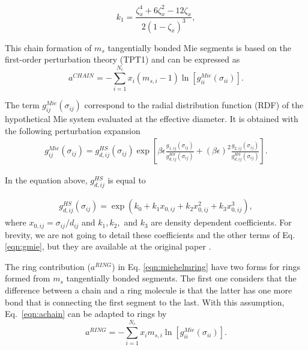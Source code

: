 \begin{equation}
k_{1} = \frac{{\zeta}_{x}^{4} +6{\zeta}_{x}^{2}- 12{\zeta}_{x}}{2(1-\zeta_{x})^{3}},
\end{equation}

 This chain formation of $m_{s}$ tangentially bonded Mie segments is based on the first-order perturbation theory (TPT1)  \cite{papa2014} and can be expressed as
	\begin{equation}
	a^{CHAIN} =-\sum_{i=1}^{N_{c}} x_{i}(m_{s,i} - 1)\ln \left [ g_{ii}^{Mie}(\sigma_{ii}) \right] .
	\label{eqn:achain}
	\end{equation}
		
	The term $g_{ij}^{Mie}(\sigma_{ij})$ correspond to the radial distribution function (RDF) of the hypothetical Mie system evaluated at the effective diameter. It is obtained with the following perturbation expansion
	\begin{equation}
	\begin{aligned}
	g_{ij}^{Mie}(\sigma_{ij}) =g_{d,ij}^{HS}(\sigma_{ij})\exp \left [\beta\epsilon \frac{g_{1,ij}(\sigma_{ij})}{g_{d,ij}^{HS}(\sigma_{ij})} + (\beta\epsilon)^{2} \frac{g_{2,ij}(\sigma_{ij})}{g_{d,ij}^{HS}(\sigma_{ij})} \right] .
	\end{aligned}
	\label{eqn:gmie}
	\end{equation}
	
	
	In the equation above, $g_{d,ij}^{HS}$ is equal to 
	
	\begin{equation}
	\begin{aligned}
	g_{d,ij}^{HS}(\sigma_{ij}) = \exp (k_{0} + k_{1} x_{0,ij} + k_{2} x_{0,ij}^{2} + k_{3} x_{0,ij}^{3}) ,
	\end{aligned}
	\label{eqn:ghs}
	\end{equation}
	where $x_{0,ij} = \sigma_{ij}/d_{ij}$ and $k_{1}, k_{2},$ and $k_{3}$ are density dependent coefficients. For brevity, we are not going to detail these coefficients and the other terms of Eq. \ref{eqn:gmie}, but they are available at the original paper \cite{lafitte2013}.  
	
	The ring contribution ($a^{RING}$) in Eq. \ref{eqn:miehelmring} have two forms for rings formed from $m_{s}$ tangentially bonded segments. The first one  \cite{lafitte2012} considers that the difference between a chain and a ring molecule is that the latter has one more bond that is connecting the first segment to the last. With this assumption, Eq.~\eqref{eqn:achain} can be adapted to rings by
	\begin{equation}
	a^{RING} =-\sum_{i=1}^{N_{c}} x_{i}m_{s,i}\ln[g_{ii}^{Mie}(\sigma_{ii})] .
	\label{eqn:aringlafitte}
	\end{equation}
	
